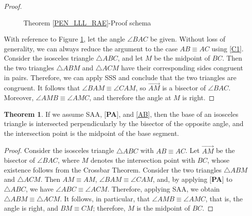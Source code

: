\documentclass[11pt,a4paper]{article}
\theoremstyle{definition}
\newtheorem{thm}{Theorem}[section]
\theoremstyle{remark}
\numberwithin{equation}{section}
\newcommand{\RightAngle}[5]{%
  \coordinate (RAa) at ($(#1)!#4!(#2)$);
  \coordinate (RAb) at ($(#1)!#5!(#3)$);
  \coordinate (RAc) at ($(RAa)+(RAb)-(#1)$);
  \draw (RAa)--(RAc)--(RAb);
}
\newcommand{\QuoteAngle}[6]{%
  \draw
    pic[
      draw,
      #6,
      angle radius=#4cm,
      angle eccentricity=1.35,
      "#5"
    ]
    {angle=#2--#1--#3};
}
\begin{document}
\begin{proof}
\begin{figure}[ht!]
\centering
{}
\caption{Theorem \ref{PEN_LLL_RAE}-Proof schema}
\label{PEN_LLL_RAE_f}
\end{figure}
With reference to Figure \ref{PEN_LLL_RAE_f}, let the angle $\angle BAC$ be given. Without loss of generality, we can always reduce the argument to the case $AB\equiv AC$ using \ref{C1}. Consider the isosceles triangle $\triangle ABC$, and let $M$ be the midpoint of $BC$. Then the two triangles $\triangle ABM$ and $\triangle ACM$ have their corresponding sides congruent in pairs. Therefore, we can apply SSS and conclude that the two triangles are congruent. It follows that $\angle BAM\equiv \angle CAM$, so $\overrightarrow{AM}$ is a bisector of $\angle BAC$. Moreover, $\angle AMB\equiv \angle AMC$, and therefore the angle at $M$ is right.
\end{proof}
\begin{thm}\label{PEN_LAA_RAE} If we assume SAA, [\textbf{PA}], and \ref{AB}, then the base of an isosceles triangle is intersected perpendicularly by the bisector of the opposite angle, and the intersection point is the midpoint of the base segment.
\end{thm}
\begin{proof}
Consider the isosceles triangle $\triangle ABC$ with $AB\equiv AC$. Let $\overrightarrow{AM}$ be the bisector of $\angle BAC$, where $M$ denotes the intersection point with $BC$, whose existence follows from the Crossbar Theorem. Consider the two triangles $\triangle ABM$ and $\triangle ACM$. Then $AM\equiv AM$, $\angle BAM\equiv\angle CAM$, and, by applying [\textbf{PA}] to $\triangle ABC$, we have $\angle ABC\equiv\angle ACM$. Therefore, applying SAA, we obtain $\triangle ABM\equiv\triangle ACM$. It follows, in particular, that $\angle AMB\equiv\angle AMC$, that is, the angle is right, and $BM\equiv CM$; therefore, $M$ is the midpoint of $BC$.
\end{proof}
\end{document}
